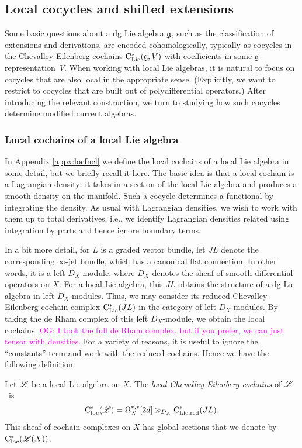 \documentclass[10pt]{amsart}
\def\owen{\textcolor{magenta}{OG: }\textcolor{magenta}}
\begin{document}
\subsection{Local cocycles and shifted extensions}

Some basic questions about a dg Lie algebra $\mathfrak g$, such as the classification of extensions and derivations, are encoded cohomologically, typically as cocycles in the Chevalley-Eilenberg cochains ${\rm C}_{\rm Lie}^*(\mathfrak g,V)$ with coefficients in some $\mathfrak g$-representation~$V$.
When working with local Lie algebras, it is natural to focus on cocycles that are also local in the appropriate sense.
(Explicitly, we want to restrict to cocycles that are built out of polydifferential operators.)
After introducing the relevant construction, we turn to studying how such cocycles determine modified current algebras.

\subsubsection{Local cochains of a local Lie algebra}

In Appendix \ref{appx:locfncl} we define the local cochains of a local Lie algebra in some detail, 
but we briefly recall it here.
The basic idea is that a local cochain is a Lagrangian density: 
it takes in a section of the local Lie algebra and produces a smooth density on the manifold. 
Such a cocycle determines a functional by integrating the density.
As usual with Lagrangian densities, we wish to work with them up to total derivatives,
i.e., we identify Lagrangian densities related using integration by parts and hence ignore boundary terms.

In a bit more detail, for $L$ is a graded vector bundle, let $JL$ denote the corresponding $\infty$-jet bundle,
which has a canonical flat connection.
In other words, it is a left $D_X$-module, where $D_X$ denotes the sheaf of smooth differential operators on $X$.
For a local Lie algebra, this $JL$ obtains the structure of a dg Lie algebra in left $D_X$-modules.
Thus, we may consider its reduced Chevalley-Eilenberg cochain complex ${\rm C}_{\rm Lie}^*(JL)$ in the category of left $D_X$-modules. 
By taking the de Rham complex of this left $D_X$-module, we obtain the local cochains.
\owen{I took the full de Rham complex, but if you prefer, we can just tensor with densities.}
For a variety of reasons, it is useful to ignore the ``constants'' term and work with the reduced cochains.
Hence we have the following definition.

\begin{dfn}
Let $\mathscr L$ be a local Lie algebra on $X$.
The {\em local Chevalley-Eilenberg cochains}  of $\mathscr L$~is 
\[
{\rm C}_{\rm loc}^*(\mathscr L) = \Omega^{*,*}_X[2d] \otimes_{D_X} {\rm C}_{\rm Lie, red}^*(J L) .
\]
This sheaf of cochain complexes on $X$ has global sections that we denote by~${\rm C}_{\rm loc}^*(\mathscr L(X))$.
\end{dfn}
\end{document}
